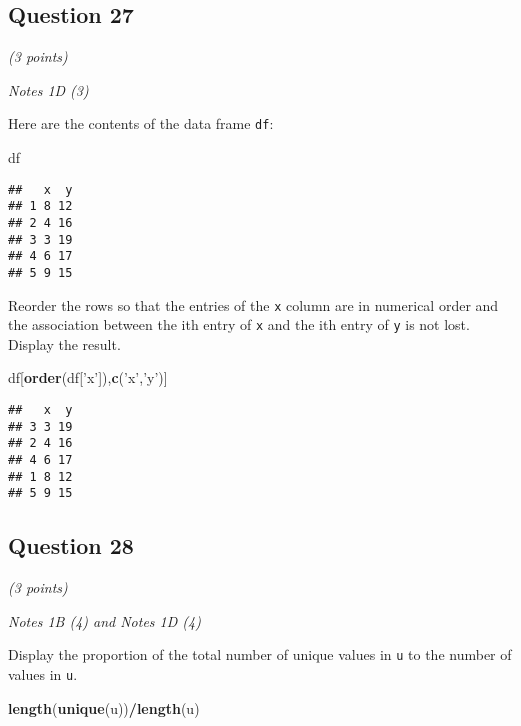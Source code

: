\documentclass[
]{article}
\newenvironment{Shaded}{\begin{snugshade}}{\end{snugshade}}
\newcommand{\KeywordTok}[1]{\textcolor[rgb]{0.13,0.29,0.53}{\textbf{#1}}}
\newcommand{\NormalTok}[1]{#1}
\newcommand{\OperatorTok}[1]{\textcolor[rgb]{0.81,0.36,0.00}{\textbf{#1}}}
\newcommand{\StringTok}[1]{\textcolor[rgb]{0.31,0.60,0.02}{#1}}
\begin{document}
\hypertarget{question-27}{%
\subsection{Question 27}\label{question-27}}

\emph{(3 points)}

\emph{Notes 1D (3)}

Here are the contents of the data frame \texttt{df}:

\begin{Shaded}
\begin{Highlighting}[]
\NormalTok{df}
\end{Highlighting}
\end{Shaded}

\begin{verbatim}
##   x  y
## 1 8 12
## 2 4 16
## 3 3 19
## 4 6 17
## 5 9 15
\end{verbatim}

Reorder the rows so that the entries of the \texttt{x} column are in
numerical order and the association between the ith entry of \texttt{x}
and the ith entry of \texttt{y} is not lost. Display the result.

\begin{Shaded}
\begin{Highlighting}[]
\NormalTok{df[}\KeywordTok{order}\NormalTok{(df[}\StringTok{'x'}\NormalTok{]),}\KeywordTok{c}\NormalTok{(}\StringTok{'x'}\NormalTok{,}\StringTok{'y'}\NormalTok{)]}
\end{Highlighting}
\end{Shaded}

\begin{verbatim}
##   x  y
## 3 3 19
## 2 4 16
## 4 6 17
## 1 8 12
## 5 9 15
\end{verbatim}

\hypertarget{question-28}{%
\subsection{Question 28}\label{question-28}}

\emph{(3 points)}

\emph{Notes 1B (4) and Notes 1D (4)}

Display the proportion of the total number of unique values in
\texttt{u} to the number of values in \texttt{u}.

\begin{Shaded}
\begin{Highlighting}[]
\KeywordTok{length}\NormalTok{(}\KeywordTok{unique}\NormalTok{(u))}\OperatorTok{/}\KeywordTok{length}\NormalTok{(u)}
\end{Highlighting}
\end{Shaded}
\end{document}
